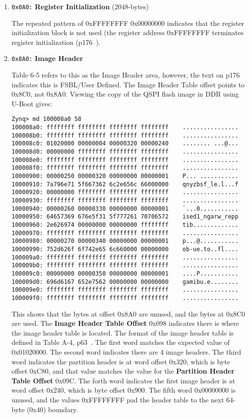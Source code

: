 \begin{enumerate}
\item \texttt{0x0A0:} \textbf{Register Initialization} (2048-bytes)

The repeated pattern of 0xFFFFFFFF 0x00000000 indicates that
the register initialization block is not used (the register
address 0xFFFFFFFF terminates register initialization
(p176~\cite{Xilinx_UG585_2021}).

\item \texttt{0x8A0:} \textbf{Image Header}

Table 6-5 refers to this as the Image Header area, however, the text on
p176 indicates this is FSBL/User Defined. The Image Header Table offset
points to 0x8C0, not 0x8A0. Viewing the copy of the QSPI flash image in
DDR using U-Boot gives:
%
\begin{verbatim}
Zynq> md 100008a0 58
100008a0: ffffffff ffffffff ffffffff ffffffff    ................
100008b0: ffffffff ffffffff ffffffff ffffffff    ................
100008c0: 01020000 00000004 00000320 00000240    ........ ...@...
100008d0: 00000000 ffffffff ffffffff ffffffff    ................
100008e0: ffffffff ffffffff ffffffff ffffffff    ................
100008f0: ffffffff ffffffff ffffffff ffffffff    ................
10000900: 00000250 00000320 00000000 00000001    P... ...........
10000910: 7a796e71 5f667362 6c2e656c 66000000    qnyzbsf_le.l...f
10000920: 00000000 ffffffff ffffffff ffffffff    ................
10000930: ffffffff ffffffff ffffffff ffffffff    ................
10000940: 00000260 00000330 00000000 00000001    `...0...........
10000950: 64657369 676e5f31 5f777261 70706572    ised1_ngarw_repp
10000960: 2e626974 00000000 00000000 ffffffff    tib.............
10000970: ffffffff ffffffff ffffffff ffffffff    ................
10000980: 00000270 00000340 00000000 00000001    p...@...........
10000990: 752d626f 6f742e65 6c660000 00000000    ob-ue.to..fl....
100009a0: ffffffff ffffffff ffffffff ffffffff    ................
100009b0: ffffffff ffffffff ffffffff ffffffff    ................
100009c0: 00000000 00000350 00000000 00000001    ....P...........
100009d0: 696d6167 652e7562 00000000 00000000    gamibu.e........
100009e0: ffffffff ffffffff ffffffff ffffffff    ................
100009f0: ffffffff ffffffff ffffffff ffffffff    ................
\end{verbatim}
%
This shows that the bytes at offset 0x8A0 are unused, and the bytes
at 0x8C0 are used.
The \textbf{Image Header Table Offset} 0x098 indicates there is where
the image header table is located. The format of the image
header table is defined in Table A-4, p63~\cite{Xilinx_UG821_2015}.
The first word matches the expected value of 0x01020000. The
second word indicates there are 4 image headers. The third word
indicates the partition header is at word offset 0x320, which is
byte offset 0xC80, and that value matches the value for the
\textbf{Partition Header Table Offset} 0x09C. The forth word
indicates the first image header is at word offset 0x240, which
is byte offset 0x900. The fifth word 0x00000000 is unused, and
the values 0xFFFFFFFF pad the header table to the next 64-byte
(0x40) boundary.


\end{enumerate}
